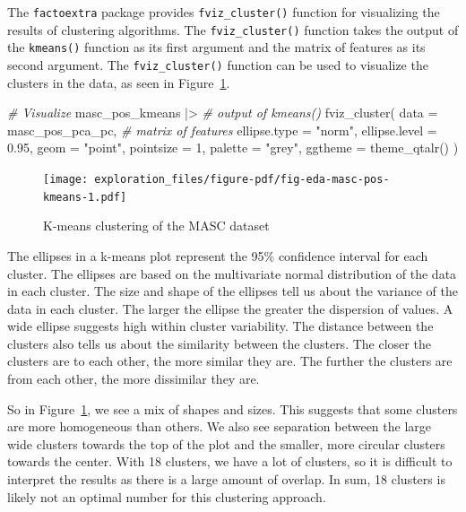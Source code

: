 \documentclass[
  letterpaper,
  DIV=11,
  numbers=noendperiod]{scrreport}
\newenvironment{Shaded}{\begin{snugshade}}{\end{snugshade}}
\newcommand{\AttributeTok}[1]{\textcolor[rgb]{0.00,0.00,0.00}{#1}}
\newcommand{\CommentTok}[1]{\textcolor[rgb]{0.00,0.00,0.00}{\textit{#1}}}
\newcommand{\DecValTok}[1]{\textcolor[rgb]{0.00,0.00,0.00}{#1}}
\newcommand{\FloatTok}[1]{\textcolor[rgb]{0.00,0.00,0.00}{#1}}
\newcommand{\FunctionTok}[1]{\textcolor[rgb]{0.00,0.00,0.00}{#1}}
\newcommand{\NormalTok}[1]{\textcolor[rgb]{0.00,0.00,0.00}{#1}}
\newcommand{\SpecialCharTok}[1]{\textcolor[rgb]{0.00,0.00,0.00}{#1}}
\newcommand{\StringTok}[1]{\textcolor[rgb]{0.00,0.00,0.00}{#1}}
\theoremstyle{definition}
\theoremstyle{remark}
\begin{document}
The \texttt{factoextra} package provides \texttt{fviz\_cluster()}
function for visualizing the results of clustering algorithms. The
\texttt{fviz\_cluster()} function takes the output of the
\texttt{kmeans()} function as its first argument and the matrix of
features as its second argument. The \texttt{fviz\_cluster()} function
can be used to visualize the clusters in the data, as seen in
Figure~\ref{fig-eda-masc-pos-kmeans}.

\begin{Shaded}
\begin{Highlighting}[]
\CommentTok{\# Visualize}
\NormalTok{masc\_pos\_kmeans }\SpecialCharTok{|\textgreater{}}  \CommentTok{\# output of kmeans()}
  \FunctionTok{fviz\_cluster}\NormalTok{(}
    \AttributeTok{data =}\NormalTok{ masc\_pos\_pca\_pc, }\CommentTok{\# matrix of features}
    \AttributeTok{ellipse.type =} \StringTok{"norm"}\NormalTok{,}
    \AttributeTok{ellipse.level =} \FloatTok{0.95}\NormalTok{,}
    \AttributeTok{geom =} \StringTok{"point"}\NormalTok{,}
    \AttributeTok{pointsize =} \DecValTok{1}\NormalTok{,}
    \AttributeTok{palette =} \StringTok{"grey"}\NormalTok{,}
    \AttributeTok{ggtheme =} \FunctionTok{theme\_qtalr}\NormalTok{()}
\NormalTok{  )}
\end{Highlighting}
\end{Shaded}

\begin{figure}[H]

{\centering \texttt{[image: exploration\_files/figure-pdf/fig-eda-masc-pos-kmeans-1.pdf]}

}

\caption{\label{fig-eda-masc-pos-kmeans}K-means clustering of the MASC
dataset}

\end{figure}

The ellipses in a k-means plot represent the 95\% confidence interval
for each cluster. The ellipses are based on the multivariate normal
distribution of the data in each cluster. The size and shape of the
ellipses tell us about the variance of the data in each cluster. The
larger the ellipse the greater the dispersion of values. A wide ellipse
suggests high within cluster variability. The distance between the
clusters also tells us about the similarity between the clusters. The
closer the clusters are to each other, the more similar they are. The
further the clusters are from each other, the more dissimilar they are.

So in Figure~\ref{fig-eda-masc-pos-kmeans}, we see a mix of shapes and
sizes. This suggests that some clusters are more homogeneous than
others. We also see separation between the large wide clusters towards
the top of the plot and the smaller, more circular clusters towards the
center. With 18 clusters, we have a lot of clusters, so it is difficult
to interpret the results as there is a large amount of overlap. In sum,
18 clusters is likely not an optimal number for this clustering
approach.
\end{document}
